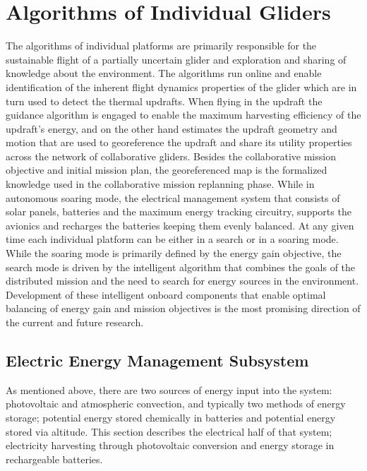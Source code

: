 \documentclass{ifacconf}
\begin{document}
\section{ Algorithms of Individual Gliders}
\label{sec:IndAlgs}

The algorithms of individual platforms are primarily responsible for the sustainable flight of a partially uncertain glider and exploration and sharing of knowledge about the environment. The algorithms run online and enable identification of the inherent flight dynamics properties of the glider which are in turn used to detect the thermal updrafts. When flying in the updraft the guidance algorithm is engaged to enable the maximum harvesting efficiency of the updraft's energy, and on the other hand estimates the updraft geometry and motion that are used to georeference the updraft and share its utility properties across the network of collaborative gliders. Besides the collaborative mission objective and initial mission plan, the georeferenced map is the formalized knowledge used in the collaborative mission replanning phase. While in autonomous soaring mode, the electrical management system that consists of solar panels, batteries and the maximum energy tracking circuitry, supports the avionics and recharges the batteries keeping them evenly balanced. At any given time each individual platform can be either in a search or in a soaring mode. While the soaring mode is primarily defined by the energy gain objective, the search mode is driven by the intelligent algorithm that combines the goals of the distributed mission and the need to search for energy sources in the environment. Development of these intelligent onboard components that enable optimal balancing of energy gain and mission objectives is the most promising direction of the current and future research.

\subsection{Electric Energy Management Subsystem}
\label{subsec:Electric}

As mentioned above, there are two sources of energy input into the system: photovoltaic and atmospheric convection, and typically two methods of energy storage; potential energy stored chemically in batteries and potential energy stored via altitude. This section describes the electrical half of that system; electricity harvesting through photovoltaic conversion and energy storage in rechargeable batteries.
\end{document}
